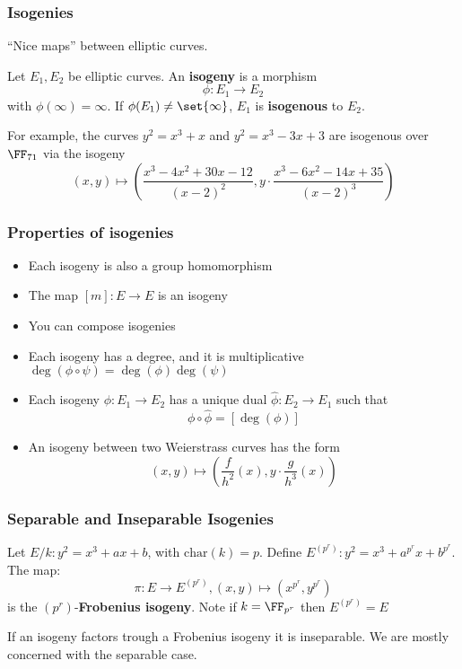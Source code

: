 \documentclass{beamer}
\begin{document}
\begin{frame}
    \frametitle{Isogenies}
    ``Nice maps'' between elliptic curves.
    \begin{definition}
        Let $E_1, E_2$ be elliptic curves. An \textbf{isogeny} is a morphism
        \[ \phi : E_1 \to E_2 \]
        with $\phi(\infty) = \infty$.
        If $\phi(E_1) \neq \set{\infty}$, $E_1$ is \textbf{isogenous} to $E_2$.
    \end{definition}
    For example, the curves $y^2 = x^3 + x$ and $y^2 = x^3 - 3x + 3$ are isogenous over $\FF_{71}$ via the isogeny 
    \[ (x, y) \mapsto \left(\frac{x^3 - 4 x^2 + 30 x -12}{(x - 2)^2}, y\cdot\frac{x^3 - 6x^2 -14x + 35}{(x - 2)^3} \right)\]
\end{frame}

\begin{frame}
    \frametitle{Properties of isogenies}

    \begin{itemize}
        \item Each isogeny is also a group homomorphism
        \item The map $[m]: E \to E$ is an isogeny
        \item You can compose isogenies
        \item Each isogeny has a degree, and it is multiplicative $\deg(\phi \circ \psi) = \deg(\phi)\deg(\psi)$
        \item Each isogeny $\phi: E_1 \to E_2$ has a unique dual $\hat{\phi}: E_2 \to E_1$ such that 
        \[ \phi \circ \hat{\phi} = [\deg(\phi)] \]
        \item An isogeny between two Weierstrass curves has the form
        \[ (x, y) \mapsto \left(\frac{f}{h^2}(x), y\cdot \frac{g}{h^3}(x) \right) \]
    \end{itemize}
\end{frame}

\begin{frame}
    \frametitle{Separable and Inseparable Isogenies}
    \begin{definition}
        Let $E/k: y^2 = x^3 + ax + b$, with $\mathrm{char}(k) = p$. Define $E^{(p^r)}: y^2 = x^3 + a^{p^r} x + b^{p^r}$.
        The map:
        \[ \pi: E \to E^{(p^r)}, (x, y) \mapsto \left(x^{p^r}, y^{p^r} \right) \]
        is the $(p^r)$-\textbf{Frobenius isogeny}. Note if $k = \FF_{p^r}$ then $E^{(p^r)} = E$
    \end{definition}
    If an isogeny factors trough a Frobenius isogeny it is inseparable. We are mostly 
    concerned with the separable case.

\end{frame}
\end{document}
